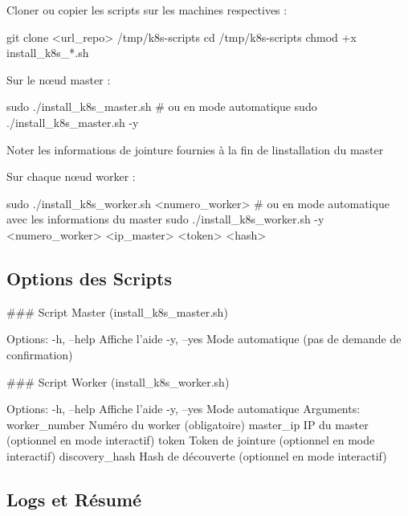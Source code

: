 \begin{DoxyEnumerate}
\item Cloner ou copier les scripts sur les machines respectives \+: 
\begin{DoxyCode}
git clone <url\_repo> /tmp/k8s-scripts
cd /tmp/k8s-scripts
chmod +x install\_k8s\_*.sh
\end{DoxyCode}

\item Sur le nœud master \+: 
\begin{DoxyCode}
sudo ./install\_k8s\_master.sh
# ou en mode automatique
sudo ./install\_k8s\_master.sh -y
\end{DoxyCode}

\item Noter les informations de jointure fournies à la fin de l\textquotesingle{}installation du master
\item Sur chaque nœud worker \+: 
\begin{DoxyCode}
sudo ./install\_k8s\_worker.sh <numero\_worker>
# ou en mode automatique avec les informations du master
sudo ./install\_k8s\_worker.sh -y <numero\_worker> <ip\_master> <token> <hash>
\end{DoxyCode}

\end{DoxyEnumerate}

\subsection*{Options des Scripts}

\#\#\# Script Master (install\+\_\+k8s\+\_\+master.\+sh) 
\begin{DoxyCode}
Options:
    -h, --help      Affiche l'aide
    -y, --yes       Mode automatique (pas de demande de confirmation)
\end{DoxyCode}


\#\#\# Script Worker (install\+\_\+k8s\+\_\+worker.\+sh) 
\begin{DoxyCode}
Options:
    -h, --help      Affiche l'aide
    -y, --yes       Mode automatique
Arguments:
    worker\_number   Numéro du worker (obligatoire)
    master\_ip       IP du master (optionnel en mode interactif)
    token          Token de jointure (optionnel en mode interactif)
    discovery\_hash  Hash de découverte (optionnel en mode interactif)
\end{DoxyCode}


\subsection*{Logs et Résumé}

